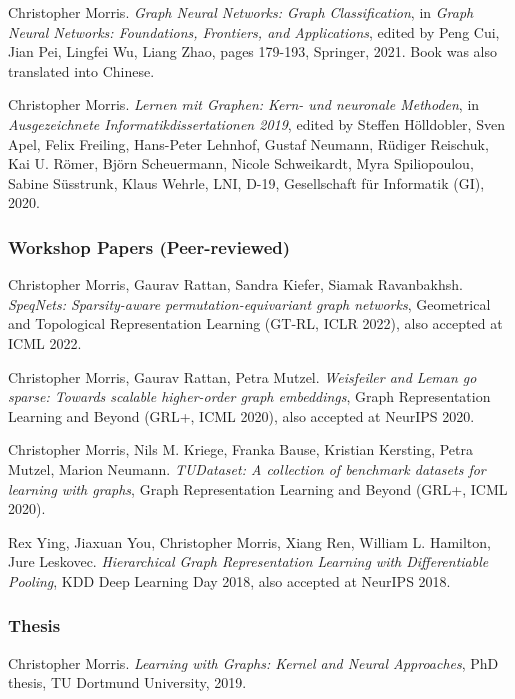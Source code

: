 \documentclass[11pt, a4paper, DIV=14, headings=small]{scrartcl}
\begin{document}
\begin{thebibliography}{15}
		Christopher Morris.
		\emph{Graph Neural Networks: Graph Classification},
		in \emph{Graph Neural Networks: Foundations, Frontiers, and Applications}, edited by Peng Cui, Jian Pei, Lingfei Wu, Liang Zhao, pages 179-193, Springer, 2021. Book was also translated into Chinese.
		
		Christopher Morris.
		\emph{Lernen mit Graphen: Kern- und neuronale Methoden}, in
		\emph{Ausgezeichnete Informatikdissertationen 2019}, edited by Steffen H{\"o}lldobler, Sven Apel, Felix Freiling, Hans-Peter Lehnhof, Gustaf Neumann, R{\"u}diger Reischuk, Kai U. R{\"o}mer, Bj{\"o}rn Scheuermann, Nicole Schweikardt, Myra Spiliopoulou, Sabine S{\"u}sstrunk, Klaus Wehrle, LNI, D-19, Gesellschaft f{\"u}r Informatik (GI), 2020.
		
		\subsubsection*{Workshop Papers (Peer-reviewed)}
		
		Christopher Morris, Gaurav Rattan, Sandra Kiefer, Siamak Ravanbakhsh.
		\emph{SpeqNets: Sparsity-aware permutation-equivariant graph networks},
		Geometrical and Topological Representation Learning (GT-RL, ICLR 2022), also accepted at ICML 2022.
		
		Christopher Morris, Gaurav Rattan, Petra Mutzel.
		\emph{Weisfeiler and Leman go sparse: Towards scalable higher-order graph embeddings},
		Graph Representation Learning and Beyond (GRL+, ICML 2020), also accepted at NeurIPS 2020.
		
		Christopher Morris, Nils M. Kriege, Franka Bause, Kristian Kersting, Petra Mutzel, Marion Neumann.
		\emph{TUDataset: A collection of benchmark datasets for learning with graphs},
		Graph Representation Learning and Beyond (GRL+, ICML 2020).
		
		Rex Ying, Jiaxuan You, Christopher Morris, Xiang Ren, William L. Hamilton, Jure Leskovec.
		\emph{Hierarchical Graph Representation Learning with Differentiable Pooling},
		KDD Deep Learning Day 2018, also accepted at NeurIPS 2018.
		
		\subsubsection*{Thesis}
		
		Christopher Morris.
		\emph{Learning with Graphs: Kernel and Neural Approaches}, PhD thesis, TU Dortmund University, 2019.
		

\end{thebibliography}
\end{document}
